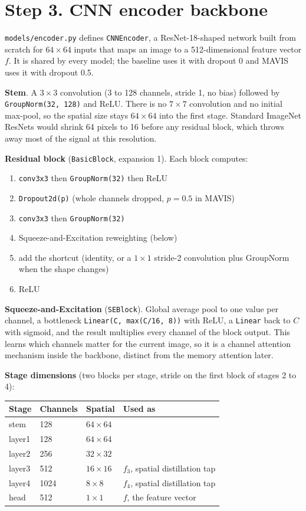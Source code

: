 \documentclass[11pt,a4paper]{article}
\newcommand{\code}[1]{\texttt{#1}}
\begin{document}
\section{Step 3. CNN encoder backbone}

\code{models/encoder.py} defines \code{CNNEncoder}, a ResNet-18-shaped network built from scratch for $64 \times 64$ inputs that maps an image to a 512-dimensional feature vector $f$. It is shared by every model; the baseline uses it with dropout 0 and MAVIS uses it with dropout 0.5.

\textbf{Stem}. A $3 \times 3$ convolution (3 to 128 channels, stride 1, no bias) followed by \code{GroupNorm(32, 128)} and ReLU. There is no $7 \times 7$ convolution and no initial max-pool, so the spatial size stays $64 \times 64$ into the first stage. Standard ImageNet ResNets would shrink 64 pixels to 16 before any residual block, which throws away most of the signal at this resolution.

\textbf{Residual block} (\code{BasicBlock}, expansion 1). Each block computes:
\begin{enumerate}
  \item \code{conv3x3} then \code{GroupNorm(32)} then ReLU
  \item \code{Dropout2d(p)} (whole channels dropped, $p = 0.5$ in MAVIS)
  \item \code{conv3x3} then \code{GroupNorm(32)}
  \item Squeeze-and-Excitation reweighting (below)
  \item add the shortcut (identity, or a $1 \times 1$ stride-2 convolution plus GroupNorm when the shape changes)
  \item ReLU
\end{enumerate}

\textbf{Squeeze-and-Excitation} (\code{SEBlock}). Global average pool to one value per channel, a bottleneck \code{Linear(C, max(C/16, 8))} with ReLU, a \code{Linear} back to $C$ with sigmoid, and the result multiplies every channel of the block output. This learns which channels matter for the current image, so it is a channel attention mechanism inside the backbone, distinct from the memory attention later.

\textbf{Stage dimensions} (two blocks per stage, stride on the first block of stages 2 to 4):

\begin{tabularx}{\textwidth}{L{2cm} L{2cm} L{2.5cm} Y}
\toprule
Stage & Channels & Spatial & Used as \\
\midrule
stem & 128 & $64 \times 64$ & \\
layer1 & 128 & $64 \times 64$ & \\
layer2 & 256 & $32 \times 32$ & \\
layer3 & 512 & $16 \times 16$ & $f_3$, spatial distillation tap \\
layer4 & 1024 & $8 \times 8$ & $f_4$, spatial distillation tap \\
head & 512 & $1 \times 1$ & $f$, the feature vector \\
\bottomrule
\end{tabularx}
\end{document}
